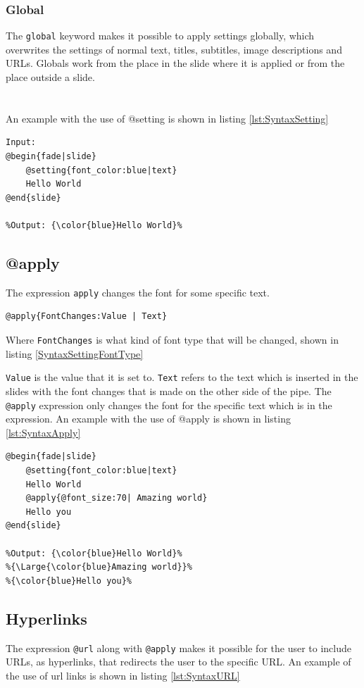 {\subsubsection*{Global}
The \texttt{global} keyword makes it possible to apply settings globally, which overwrites the settings of normal text, titles, subtitles, image descriptions and URLs. Globals work from the place in the slide where it is applied or from the place outside a slide.\\
\\ \\
An example with the use of @setting is shown in listing \ref{lst:SyntaxSetting}

\begin{lstlisting}[frame=single, caption=Hello World with setting, label=lst:SyntaxSetting]
Input:
@begin{fade|slide}
    @setting{font_color:blue|text}
    Hello World
@end{slide}

%Output: {\color{blue}Hello World}%
\end{lstlisting}

\subsection{@apply}
The expression \texttt{apply} changes the font for some specific text.
\begin{lstlisting}[frame=single]
@apply{FontChanges:Value | Text}
\end{lstlisting}
Where \texttt{FontChanges} is what kind of font type that will be changed, shown in listing \ref{SyntaxSettingFontType}

\texttt{Value} is the value that it is set to. 
\texttt{Text} refers to the text which is inserted in the slides with the font changes that is made on the other side of the pipe.
The \texttt{@apply} expression only changes the font for the specific text which is in the expression.
An example with the use of @apply is shown in listing \ref{lst:SyntaxApply}

\begin{lstlisting}[frame=single, caption=Hello World with apply, label=lst:SyntaxApply]
@begin{fade|slide}
    @setting{font_color:blue|text}
    Hello World
    @apply{@font_size:70| Amazing world}
    Hello you
@end{slide}

%Output: {\color{blue}Hello World}%
%{\Large{\color{blue}Amazing world}}%
%{\color{blue}Hello you}%
\end{lstlisting}

\subsection{Hyperlinks}
The expression \texttt{@url} along with \texttt{@apply} makes it possible for the user to include URLs, as hyperlinks, that redirects the user to the specific URL.
An example of the use of url links is shown in listing \ref{lst:SyntaxURL}

}
